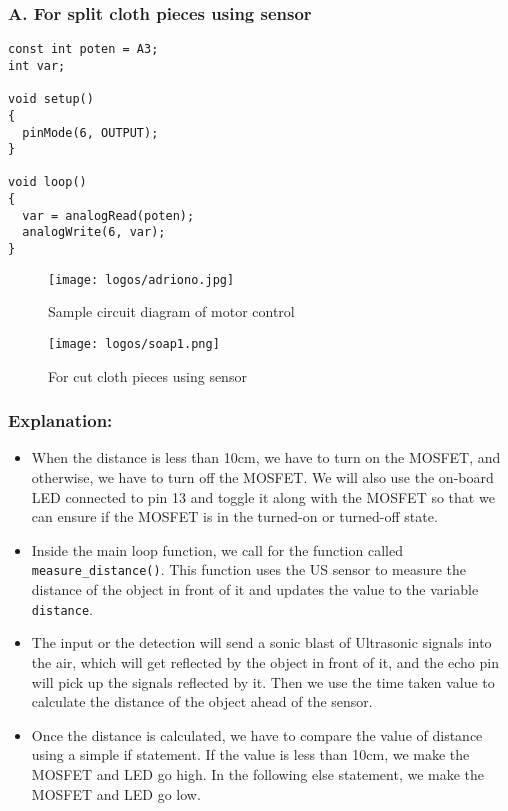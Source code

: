 \documentclass[table,french,english]{rapportCS}
\begin{document}
\subsubsection{A. For split cloth pieces using sensor}

\begin{lstlisting}
const int poten = A3;
int var;

void setup()
{
  pinMode(6, OUTPUT);
}

void loop()
{
  var = analogRead(poten);
  analogWrite(6, var);
}

\end{lstlisting}
\vspace{0.5cm}
\begin{figure}[h]
    \centering
    \texttt{[image: logos/adriono.jpg]}
    \caption{Sample circuit diagram of motor control}
    \label{fig:outlinemindmap}
\end{figure}
\newpage
\begin{figure}[h]
    \centering
    \vspace{2cm}
    \texttt{[image: logos/soap1.png]}
    \caption{  For cut cloth pieces using sensor}
    \label{fig:outlinemindmap}
\end{figure}

\subsubsection*{Explanation:}
\begin{itemize}[label=$\bullet$]
    
\item When the distance is less than 10cm, we have to turn on the MOSFET, and otherwise, we have to turn off the MOSFET. We will also use the on-board LED connected to pin 13 and toggle it along with the MOSFET so that we can ensure if the MOSFET is in the turned-on or turned-off state.

\item Inside the main loop function, we call for the function called \texttt{measure\_distance()}. This function uses the US sensor to measure the distance of the object in front of it and updates the value to the variable \texttt{distance}.

\item The input or the detection will send a sonic blast of Ultrasonic signals into the air, which will get reflected by the object in front of it, and the echo pin will pick up the signals reflected by it. Then we use the time taken value to calculate the distance of the object ahead of the sensor.

\item Once the distance is calculated, we have to compare the value of distance using a simple if statement. If the value is less than 10cm, we make the MOSFET and LED go high. In the following else statement, we make the MOSFET and LED go low.
\end{itemize}
\end{document}
